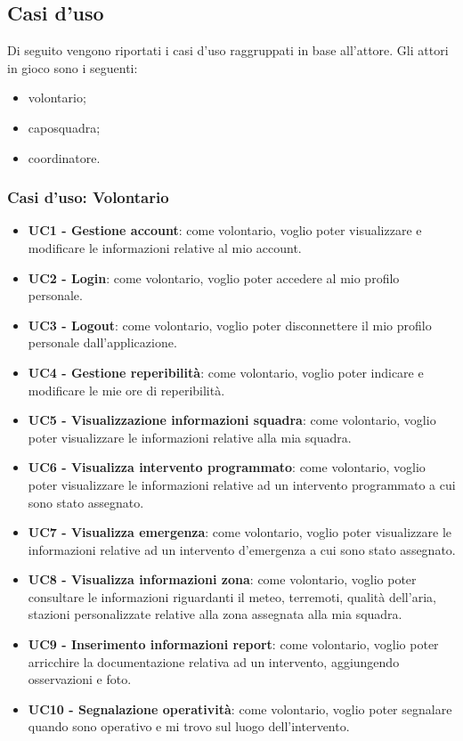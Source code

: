 \subsection{Casi d'uso}
Di seguito vengono riportati i casi d'uso raggruppati in base all'attore. Gli attori in gioco sono i seguenti:
\begin{itemize}
	\item volontario;
	\item caposquadra;
	\item coordinatore.
\end{itemize}

\subsubsection{Casi d'uso: Volontario}
\begin{itemize}
	\item \textbf{UC1 - Gestione account}:
	come volontario, voglio poter visualizzare e modificare le informazioni relative al mio account.
	
	\item \textbf{UC2 - Login}:
	come volontario, voglio poter accedere al mio profilo personale.
	
	\item \textbf{UC3 - Logout}:
	come volontario, voglio poter disconnettere il mio profilo personale dall'applicazione.
	
	\item \textbf{UC4 - Gestione reperibilità}:
	come volontario, voglio poter indicare e modificare le mie ore di reperibilità.
	
	\item \textbf{UC5 - Visualizzazione informazioni squadra}:
	come volontario, voglio poter visualizzare le informazioni relative alla mia squadra.
	
	\item \textbf{UC6 - Visualizza intervento programmato}:
	come volontario, voglio poter visualizzare le informazioni relative ad un intervento programmato a cui sono stato assegnato.
	
	\item \textbf{UC7 - Visualizza emergenza}:
	come volontario, voglio poter visualizzare le informazioni relative ad un intervento d'emergenza a cui sono stato assegnato.
	
	\item \textbf{UC8 - Visualizza informazioni zona}:
	come volontario, voglio poter consultare le informazioni riguardanti il meteo, terremoti, qualità dell'aria, stazioni personalizzate relative alla zona assegnata alla mia squadra.
	
	\item \textbf{UC9 - Inserimento informazioni report}:
	come volontario, voglio poter arricchire la documentazione relativa ad un intervento, aggiungendo osservazioni e foto.
	
	\item \textbf{UC10 - Segnalazione operatività}:
	come volontario, voglio poter segnalare quando sono operativo e mi trovo sul luogo dell'intervento.
\end{itemize}




